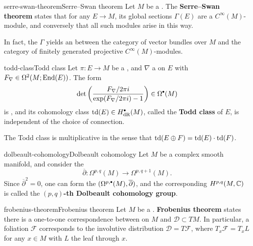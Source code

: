 \begin{topic}{serre-swan-theorem}{Serre--Swan theorem}
    Let $M$ be a  . The \textbf{Serre--Swan theorem} states that for any  $E \to M$, its global sections $\Gamma(E)$ are a   $C^\infty(M)$-module, and conversely that all such modules arise in this way.
    
    In fact, the  $\Gamma$ yields an  between the category of vector bundles over $M$ and the category of finitely generated projective $C^\infty(M)$-modules.
\end{topic}

\begin{topic}{todd-class}{Todd class}
    Let $\pi : E \to M$ be a , and $\nabla$ a  on $E$ with  $F_\nabla \in \Omega^2(M; \textup{End}(E))$. The form
    \[ \det\left(\frac{F_\nabla / 2 \pi i}{\exp(F_\nabla / 2 \pi i) - 1}\right) \in \Omega^\bdot(M) \]
    is , and its cohomology class $\textup{td}(E) \in H^\bdot_\textup{dR}(M)$, called the \textbf{Todd class} of $E$, is independent of the choice of connection.
    
    The Todd class is multiplicative in the sense that $\textup{td}(E \oplus F) = \textup{td}(E) \cdot \textup{td}(F)$.
\end{topic}

\begin{topic}{dolbeault-cohomology}{Dolbeault cohomology}
    Let $M$ be a complex smooth manifold, and consider the 
    \[ \overline{\partial} : \Omega^{p, q}(M) \to \Omega^{p, q + 1}(M) . \]
    Since $\overline{\partial}^2 = 0$, one can form the  $(\Omega^{p, \bdot}(M), \overline{\partial})$, and the corresponding  $H^{p, q}(M, \mathbb{C})$ is called the \textbf{$(p, q)$-th Dolbeault cohomology group}.
\end{topic}

\begin{topic}{frobenius-theorem}{Frobenius theorem}
    Let $M$ be a . \textbf{Frobenius theorem} states there is a one-to-one correspondence between  on $M$ and  $\mathcal{D} \subset TM$. In particular, a foliation $\mathcal{F}$ corresponds to the involutive distribution $\mathcal{D} = T \mathcal{F}$, where $T_x \mathcal{F} = T_x L$ for any $x \in M$ with $L$ the leaf through $x$.
\end{topic}


